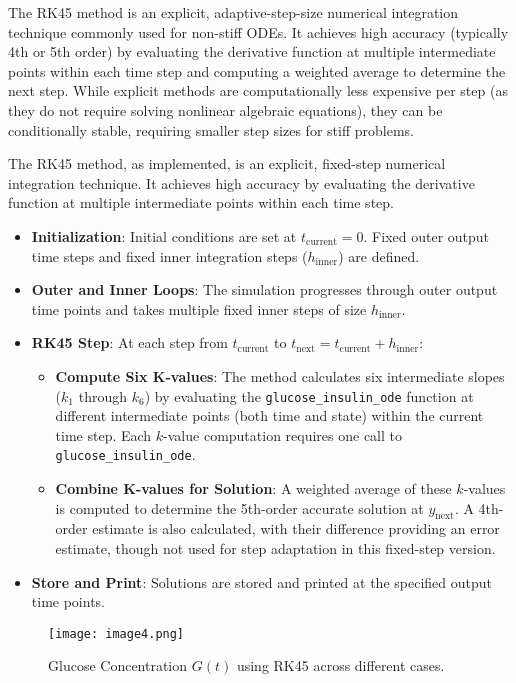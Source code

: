 \documentclass[conference]{IEEEtran}
\begin{document}
The RK45 method is an explicit, adaptive-step-size numerical integration technique commonly used for non-stiff ODEs. It achieves high accuracy (typically 4th or 5th order) by evaluating the derivative function at multiple intermediate points within each time step and computing a weighted average to determine the next step. While explicit methods are computationally less expensive per step (as they do not require solving nonlinear algebraic equations), they can be conditionally stable, requiring smaller step sizes for stiff problems.

The RK45 method, as implemented, is an explicit, fixed-step numerical integration technique. It achieves high accuracy by evaluating the derivative function at multiple intermediate points within each time step.

\begin{itemize}
    \item \textbf{Initialization}: Initial conditions are set at $t_{\text{current}} = 0$. Fixed outer output time steps and fixed inner integration steps ($h_{\text{inner}}$) are defined.
    \item \textbf{Outer and Inner Loops}: The simulation progresses through outer output time points and takes multiple fixed inner steps of size $h_{\text{inner}}$.
    \item \textbf{RK45 Step}: At each step from $t_{\text{current}}$ to $t_{\text{next}} = t_{\text{current}} + h_{\text{inner}}$:
    \begin{itemize}
        \item \textbf{Compute Six K-values}: The method calculates six intermediate slopes ($k_1$ through $k_6$) by evaluating the \texttt{glucose\_insulin\_ode} function at different intermediate points (both time and state) within the current time step. Each $k$-value computation requires one call to \texttt{glucose\_insulin\_ode}.
        \item \textbf{Combine K-values for Solution}: A weighted average of these $k$-values is computed to determine the 5th-order accurate solution at $y_{\text{next}}$. A 4th-order estimate is also calculated, with their difference providing an error estimate, though not used for step adaptation in this fixed-step version.
    \end{itemize}
    \item \textbf{Store and Print}: Solutions are stored and printed at the specified output time points.
\end{itemize}
\begin{figure}[H]
    \centering
    \texttt{[image: image4.png]}
    \caption{Glucose Concentration $G(t)$ using RK45 across different cases.}
    \label{fig:rk45_glucose}
\end{figure}
\end{document}
